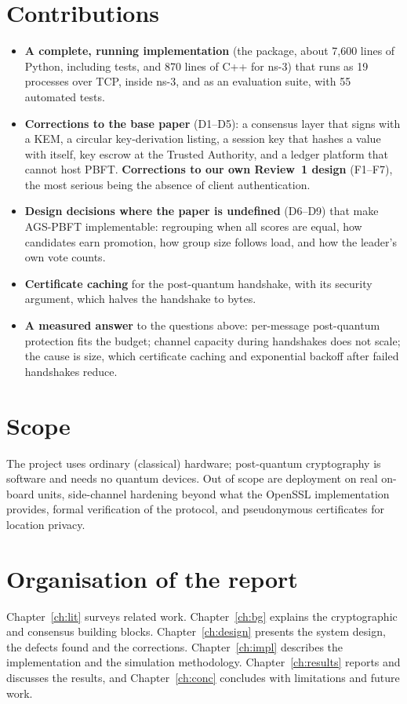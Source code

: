 \section{Contributions}

\begin{itemize}
\item \textbf{A complete, running implementation} (the  package,
about 7,600 lines of Python, including tests, and 870 lines of C++ for ns-3) that runs as 19
processes over TCP, inside ns-3, and as an evaluation suite, with 55 automated
tests.
\item \textbf{Corrections to the base paper} (D1--D5): a consensus layer that
signs with a KEM, a circular key-derivation listing, a session key that
hashes a value with itself, key escrow at the Trusted Authority, and a ledger
platform that cannot host PBFT. \textbf{Corrections to our own Review~1
design} (F1--F7), the most serious being the absence of client
authentication.
\item \textbf{Design decisions where the paper is undefined} (D6--D9) that
make AGS-PBFT implementable: regrouping when all scores are equal, how
candidates earn promotion, how group size follows load, and how the leader's
own vote counts.
\item \textbf{Certificate caching} for the post-quantum handshake, with its
security argument, which halves the handshake to  bytes.
\item \textbf{A measured answer} to the questions above: per-message
post-quantum protection fits the budget; channel capacity during handshakes
does not scale; the cause is size, which certificate caching and
exponential backoff after failed handshakes reduce.
\end{itemize}

\section{Scope}

The project uses ordinary (classical) hardware; post-quantum cryptography is
software and needs no quantum devices. Out of scope are deployment on real
on-board units, side-channel hardening beyond what the OpenSSL implementation
provides, formal verification of the protocol, and pseudonymous certificates
for location privacy.

\section{Organisation of the report}

Chapter~\ref{ch:lit} surveys related work. Chapter~\ref{ch:bg} explains the
cryptographic and consensus building blocks. Chapter~\ref{ch:design}
presents the system design, the defects found and the corrections.
Chapter~\ref{ch:impl} describes the implementation and the simulation
methodology. Chapter~\ref{ch:results} reports and discusses the results, and
Chapter~\ref{ch:conc} concludes with limitations and future work.
